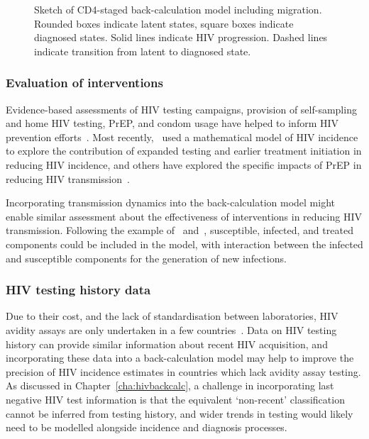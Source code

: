 \begin{figure}[htbp!]
  \caption[Sketch of CD4-staged back-calculation model including migration]{Sketch of CD4-staged back-calculation model including migration. Rounded boxes indicate latent states, square boxes indicate diagnosed states. Solid lines indicate HIV progression. Dashed lines indicate transition from latent to diagnosed state.}\label{fig:back-calc-migration}
\end{figure}

\subsubsection{Evaluation of interventions}

Evidence-based assessments of HIV testing campaigns, provision of self-sampling and home HIV testing, PrEP, and condom usage have helped to inform HIV prevention efforts~\parencite{HIV_Commission2020-yy}. Most recently,~\cite{Cambiano2023-lj} used a mathematical model of HIV incidence to explore the contribution of expanded testing and earlier treatment initiation in reducing HIV incidence, and others have explored the specific impacts of PrEP in reducing HIV transmission~\parencite{Punyacharoensin2016-hs, Rozhnova2018-zp}. 

Incorporating transmission dynamics into the back-calculation model might enable similar assessment about the effectiveness of interventions in reducing HIV transmission. Following the example of~\cite{Presanis2011-uy} and~\cite{Birrell2011-lx}, susceptible, infected, and treated components could be included in the model, with interaction between the infected and susceptible components for the generation of new infections.

\subsubsection{HIV testing history data}

Due to their cost, and the lack of standardisation between laboratories, HIV avidity assays are only undertaken in a few countries~\parencite{European_Centre_for_Disease_Prevention_and_Control2023-vt}. Data on HIV testing history can provide similar information about recent HIV acquisition, and incorporating these data into a back-calculation model may help to improve the precision of HIV incidence estimates in countries which lack avidity assay testing. As discussed in Chapter~\ref{cha:hivbackcalc}, a challenge in incorporating last negative HIV test information is that the equivalent `non-recent' classification cannot be inferred from testing history, and wider trends in testing would likely need to be modelled alongside incidence and diagnosis processes.

